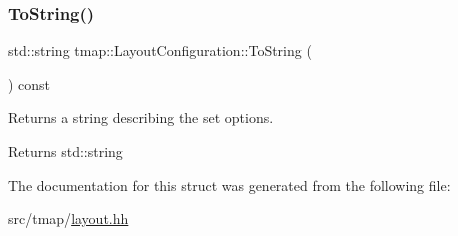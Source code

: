 \subsubsection{\texorpdfstring{To\+String()}{ToString()}}
{\footnotesize\ttfamily std\+::string tmap\+::\+Layout\+Configuration\+::\+To\+String (\begin{DoxyParamCaption}{ }\end{DoxyParamCaption}) const\hspace{0.3cm}{\ttfamily [inline]}}



Returns a string describing the set options. 

\begin{DoxyReturn}{Returns}
std\+::string 
\end{DoxyReturn}


The documentation for this struct was generated from the following file\+:\begin{DoxyCompactItemize}
\item 
src/tmap/\hyperlink{layout_8hh}{layout.\+hh}\end{DoxyCompactItemize}
